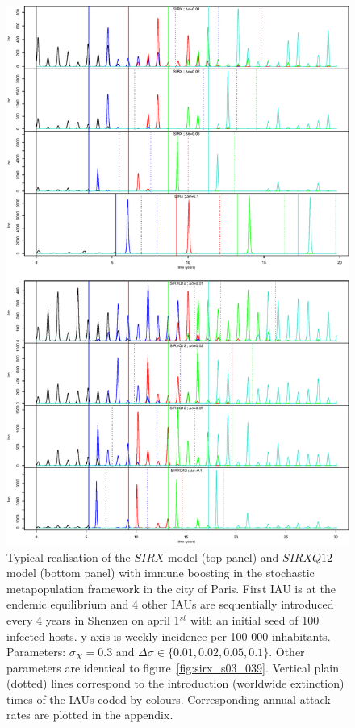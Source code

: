 \begin{figure}[!htbp]
  \center
  \includegraphics[width=0.8\linewidth]{texte/article3/graph/traj_metapop.eps}
  \caption{Typical realisation of the $SIRX$ model (top panel) and
    $SIRXQ12$ model (bottom panel) with immune boosting in the
    stochastic metapopulation framework in the city of Paris. First
    IAU is at the endemic equilibrium and 4 other IAUs are
    sequentially introduced every 4 years in Shenzen on april 1$^{st}$
    with an initial seed of 100 infected hosts. y-axis is weekly
    incidence per 100 000 inhabitants. Parameters: $\sigma_{X}=0.3$
    and $\Delta\sigma\in\{0.01, 0.02, 0.05, 0.1\}$. Other parameters
    are identical to figure~\ref{fig:sirx_s03_039}. Vertical plain
    (dotted) lines correspond to the introduction (worldwide
    extinction) times of the IAUs coded by colours. Corresponding
    annual attack rates are plotted in the appendix.}
  \label{fig:world_sirx}
\end{figure}

